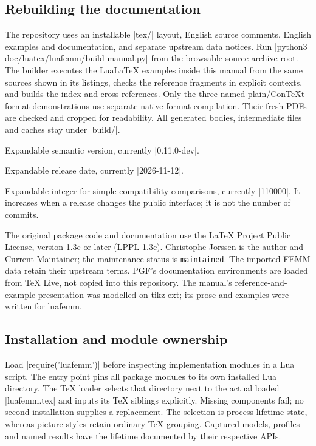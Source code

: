 \subsection{Rebuilding the documentation}
The repository uses an installable |tex/| layout, English source comments,
English examples and documentation, and separate upstream data notices.
Run |python3 doc/luatex/luafemm/build-manual.py| from the browsable source
archive root. The builder executes the LuaLaTeX examples inside this manual
from the same sources shown in its listings, checks the reference fragments
in explicit contexts, and builds the index and cross-references. Only the
three named plain/ConTeXt format demonstrations use separate native-format
compilation. Their fresh PDFs are checked and cropped for readability.
All generated bodies, intermediate files and caches stay under |build/|.

\begin{command}{\luafemmversion}
Expandable semantic version, currently |0.11.0-dev|.
\end{command}
\begin{command}{\luafemmversiondate}
Expandable release date, currently |2026-11-12|.
\end{command}
\begin{command}{\luafemmversionnumber}
Expandable integer for simple compatibility comparisons, currently |110000|.
It increases when a release changes the public interface; it is not the
number of commits.
\end{command}

The original package code and documentation use the LaTeX Project Public
License, version 1.3c or later (LPPL-1.3c). Christophe Jorssen is the author and
Current Maintainer; the maintenance status is \texttt{maintained}. The
imported FEMM data retain their upstream terms. PGF's documentation
environments are loaded from TeX Live, not copied into this repository.
The manual's reference-and-example presentation was modelled on tikz-ext;
its prose and examples were written for luafemm.

\subsection{Installation and module ownership}
Load |require('luafemm')| before inspecting implementation modules in a Lua
script. The entry point pins all package modules to its own installed Lua
directory. The TeX loader selects that directory next to the actual loaded
|luafemm.tex| and inputs its TeX siblings explicitly. Missing components fail;
no second installation supplies a replacement. The selection is process-lifetime
state, whereas picture styles retain ordinary TeX grouping. Captured models,
profiles and named results have the lifetime documented by their respective APIs.
